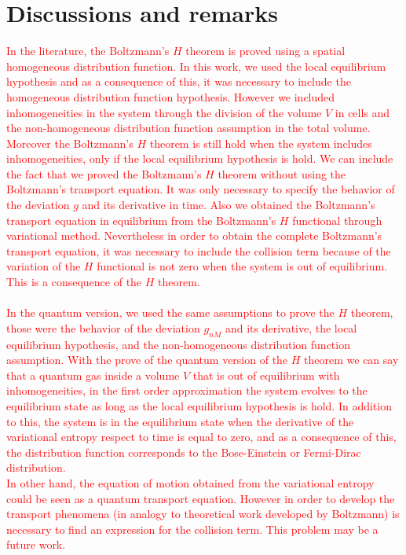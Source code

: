 \documentclass{article}
\begin{document}
\section{Discussions and remarks}
\textcolor{red}{
In the literature, the Boltzmann's $H$ theorem is proved using a spatial homogeneous distribution function. In this work, we used the local equilibrium hypothesis and as a consequence of this, it was necessary to include the homogeneous distribution function hypothesis. However we included inhomogeneities in the system through the division of the volume $V$ in cells and the %
non-homogeneous distribution function assumption in the total volume. Moreover the Boltzmann's $H$ theorem is still hold when the system includes inhomogeneities, only if the local equilibrium hypothesis is hold. We can include the fact that we proved the Boltzmann's $H$ theorem without using the Boltzmann's transport equation. It was only necessary to specify the behavior of the deviation $g$ and its derivative in time. Also we obtained the Boltzmann's transport equation in equilibrium from the Boltzmann's $H$ functional through variational method. Nevertheless in order to obtain the complete Boltzmann's transport equation, it was necessary to include the collision term because of the variation of the $H$ functional is not zero when the system is out of equilibrium. This is a consequence of the $H$ theorem.\\
\\
In the quantum version, we used the same assumptions to prove the $H$ theorem, those were the behavior of the deviation $g_{nM}$ and its derivative, the local equilibrium hypothesis, and the non-homogeneous distribution function assumption. With the prove of the quantum version of the $H$ theorem we can say that a quantum gas inside a volume $V$ that is out of equilibrium with inhomogeneities, in the first order approximation the system evolves to the equilibrium state as long as the local equilibrium hypothesis is hold. In addition to this, the system is in the equilibrium state when the derivative of the variational entropy respect to time is equal to zero, and as a consequence of this, the distribution function corresponds to the Bose-Einstein or Fermi-Dirac distribution.\\
In other hand, the equation of motion obtained from the variational entropy could be seen as a quantum transport equation. However in order to develop the transport phenomena (in analogy to theoretical work developed by Boltzmann) is necessary to find an expression for the collision term. This problem may be a future work.\\
}
\end{document}
